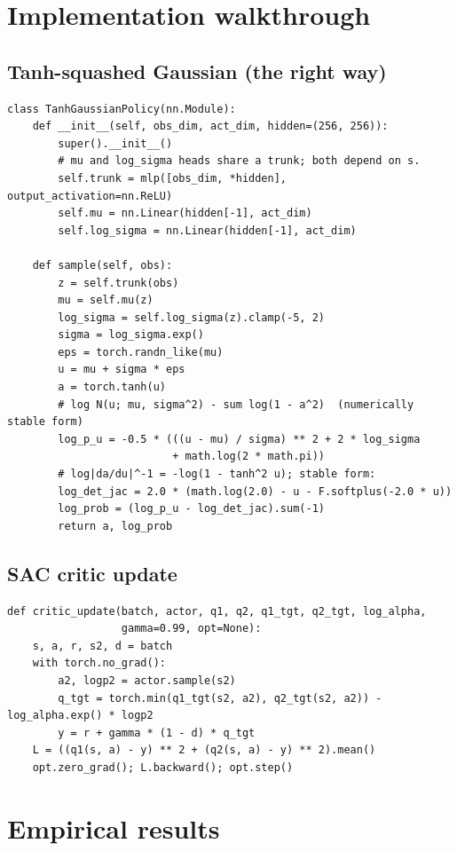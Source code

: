 \documentclass[11pt,oneside]{scrbook}
\begin{document}
\chapter{Implementation walkthrough}

\section{Tanh-squashed Gaussian (the right way)}

\begin{verbatim}
class TanhGaussianPolicy(nn.Module):
    def __init__(self, obs_dim, act_dim, hidden=(256, 256)):
        super().__init__()
        # mu and log_sigma heads share a trunk; both depend on s.
        self.trunk = mlp([obs_dim, *hidden], output_activation=nn.ReLU)
        self.mu = nn.Linear(hidden[-1], act_dim)
        self.log_sigma = nn.Linear(hidden[-1], act_dim)

    def sample(self, obs):
        z = self.trunk(obs)
        mu = self.mu(z)
        log_sigma = self.log_sigma(z).clamp(-5, 2)
        sigma = log_sigma.exp()
        eps = torch.randn_like(mu)
        u = mu + sigma * eps
        a = torch.tanh(u)
        # log N(u; mu, sigma^2) - sum log(1 - a^2)  (numerically stable form)
        log_p_u = -0.5 * (((u - mu) / sigma) ** 2 + 2 * log_sigma
                          + math.log(2 * math.pi))
        # log|da/du|^-1 = -log(1 - tanh^2 u); stable form:
        log_det_jac = 2.0 * (math.log(2.0) - u - F.softplus(-2.0 * u))
        log_prob = (log_p_u - log_det_jac).sum(-1)
        return a, log_prob
\end{verbatim}

\section{SAC critic update}

\begin{verbatim}
def critic_update(batch, actor, q1, q2, q1_tgt, q2_tgt, log_alpha,
                  gamma=0.99, opt=None):
    s, a, r, s2, d = batch
    with torch.no_grad():
        a2, logp2 = actor.sample(s2)
        q_tgt = torch.min(q1_tgt(s2, a2), q2_tgt(s2, a2)) - log_alpha.exp() * logp2
        y = r + gamma * (1 - d) * q_tgt
    L = ((q1(s, a) - y) ** 2 + (q2(s, a) - y) ** 2).mean()
    opt.zero_grad(); L.backward(); opt.step()
\end{verbatim}

\chapter{Empirical results}
\end{document}
